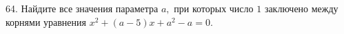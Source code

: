 64. Найдите все значения параметра $a,$ при которых число $1$ заключено между корнями уравнения $x^2+(a-5)x+a^2-a=0.$\\
